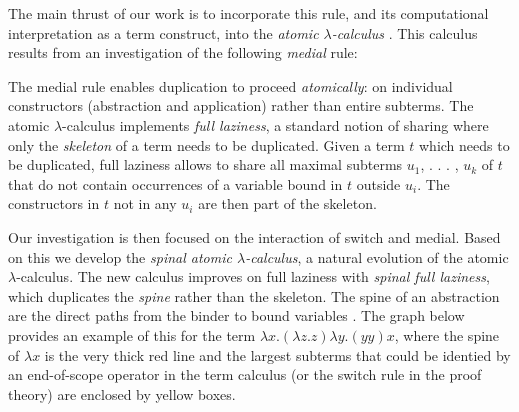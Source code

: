 \documentclass[a4paper,UKenglish,cleveref, autoref]{lipics-v2019}
\begin{document}
The main thrust of our work is to incorporate this rule, and its computational interpretation as a term construct, into the \emph{atomic $\lambda$-calculus} \cite{gundersen2013atomic}. This calculus results from an investigation of the following \emph{medial} rule:
\begin{center}
\end{center}
The medial rule enables duplication to proceed \emph{atomically}: on individual constructors (abstraction and application) rather than entire subterms. The atomic $\lambda$-calculus implements \emph{full laziness}, a standard notion of sharing where only the \emph{skeleton} of a term needs to be duplicated. Given a term $t$ which needs to be duplicated, full laziness allows to share all maximal subterms $u_{1}$, . . . , $u_{k}$ of $t$ that do not contain occurrences of a variable bound in $t$ outside $u_{i}$. The constructors in $t$ not in any $u_{i}$ are then part of the skeleton.

Our investigation is then focused on the interaction of switch and medial. Based on this we develop the \emph{spinal atomic $\lambda$-calculus}, a natural evolution of the atomic $\lambda$-calculus. The new calculus improves on full laziness with \emph{spinal full laziness}, which duplicates the \emph{spine} rather than the skeleton. The spine of an abstraction are the direct paths from the binder to bound variables \cite{Balabonski12}. The graph below provides an example of this for the term $\lambda x . (\lambda z . z) \lambda y . (y y) x$, where the spine of $\lambda x$ is the very thick red line and the largest subterms that could be identied by an end-of-scope operator in the term calculus (or the switch rule in the proof theory) are enclosed by yellow boxes. %




%
\end{document}
